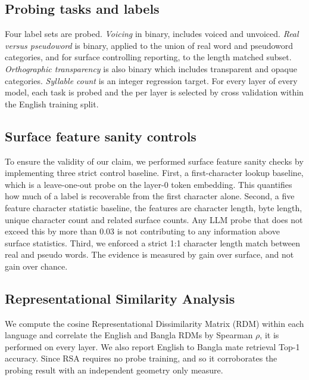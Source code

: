 \documentclass[preprint,12pt]{elsarticle}
\begin{document}
\subsection{Probing tasks and labels}
Four label sets are probed. \emph{Voicing} in binary, includes voiced and unvoiced. \emph{Real versus pseudoword} is binary, applied to the union of real word and pseudoword categories, and for surface controlling reporting, to the length matched subset. \emph{Orthographic transparency} is also binary which includes transparent and opaque categories. \emph{Syllable count} is an integer regression target. For every layer of every model, each task is probed and the per layer is selected by cross validation within the English training split.

\subsection{Surface feature sanity controls}
To ensure the validity of our claim, we performed surface feature sanity checks by implementing three strict control baseline. First, a first-character lookup baseline, which is a leave-one-out probe on the layer-0 token embedding. This quantifies how much of a label is recoverable from the first character alone. Second, a five feature character statistic baseline, the features are character length, byte length, unique character count and related surface counts. Any LLM probe that does not exceed this by more than 0.03 is not contributing to any information above surface statistics. Third, we enforced a strict 1:1 character length match between real and pseudo words. The evidence is measured by gain over surface, and not gain over chance.

\subsection{Representational Similarity Analysis}
We compute the cosine Representational Dissimilarity Matrix (RDM) \cite{kriegeskorte2008rsa} within each language and correlate the English and Bangla RDMs by Spearman $\rho$, it is performed on every layer. We also report English to Bangla mate retrieval Top-1 accuracy. Since RSA requires no probe training, and so it corroborates the probing result with an independent geometry only measure.
\end{document}
